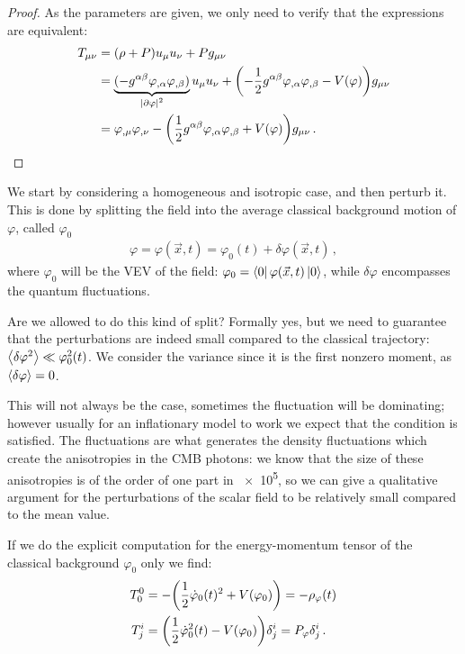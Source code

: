 \documentclass[main.tex]{subfiles}
\begin{document}
\begin{proof}
As the parameters are given, we only need to verify that the expressions are equivalent: 
%
\begin{align}
T_{\mu \nu } &= (\rho + P ) u_\mu u_\nu + P g_{\mu \nu }   \\
&= \underbrace{(- g^{\alpha \beta } \varphi_{, \alpha } \varphi_{, \beta } )}_{\abs{\partial \varphi}^2} u_\mu u_\nu + \qty( -\frac{1}{2} g^{\alpha \beta } \varphi_{, \alpha } \varphi_{, \beta } - V(\varphi ) ) g_{\mu \nu }  \\
&= \varphi_{, \mu } \varphi_{, \nu } - \qty(\frac{1}{2} g^{\alpha \beta } \varphi_{, \alpha } \varphi_{, \beta } + V(\varphi )) g_{\mu \nu }
\,.
\end{align}
\end{proof}

We start by considering a homogeneous and isotropic case, and then perturb it. This is done by splitting the field into the average classical background motion of \(\varphi \), called \(\varphi_0 \) 
%
\begin{align}
\varphi = \varphi (\vec{x}, t) = \varphi_0 (t) + \delta \varphi (\vec{x}, t)
\,,
\end{align}
%
where \(\varphi_0 \) will be the VEV of the field: \(\varphi_0 = \bra{0} \varphi (\vec{x}, t) \ket{0}\), while \(\delta \varphi \) encompasses the quantum fluctuations. 

Are we allowed to do this kind of split?
Formally yes, but we need to guarantee that the perturbations are indeed small compared to the classical trajectory: \(\expval{ \delta \varphi^2} \ll \varphi_0^2 (t)\).
We consider the variance since it is the first nonzero moment, as \(\expval{ \delta \varphi }= 0\). 

This will not always be the case, sometimes the fluctuation will be dominating; however usually for an inflationary model to work we expect that the condition is satisfied.
The fluctuations are what generates the density fluctuations which create the anisotropies in the CMB photons: we know that the size of these anisotropies is of the order of one part in \num{e5}, so we can give a qualitative argument for the perturbations of the scalar field to be relatively small compared to the mean value. 

If we do the explicit computation for the energy-momentum tensor of the classical background \(\varphi_0\) only we find:
%
\begin{align} \label{eq:energy-momentum-scalar-field}
T^{0}_{0} &= - \qty( \frac{1}{2} \dot{\varphi}_0(t)^2 + V(\varphi_0 )) = - \rho_\varphi (t)   \\
T^{i}_{j} &= \qty( \frac{1}{2} \dot{\varphi}_0^2 (t) - V(\varphi_0 )) \delta^{i}_{j} = P_\varphi \delta^{i}_{j}
\,.
\end{align}
\end{document}
